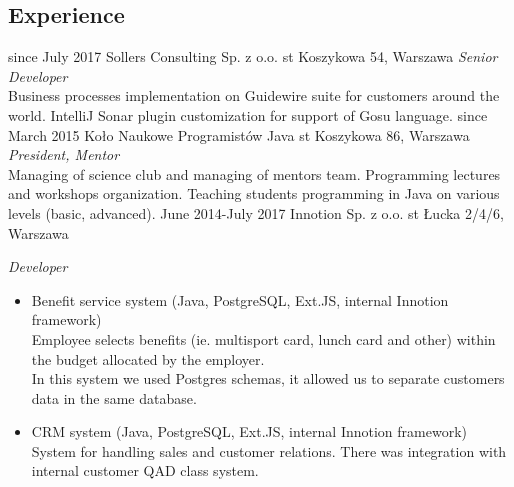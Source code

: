 \documentclass[]{friggeri-cv} %
\begin{document}
	\begin{absolutelynopagebreak}
		\section{Experience}
		\begin{entrylist}
			\entry
			{since July 2017}
			{Sollers Consulting Sp. z o.o.}
			{st Koszykowa 54, Warszawa}
			{\emph{Senior Developer}\\
				Business processes implementation on Guidewire suite for customers around the world. IntelliJ Sonar plugin customization for support of Gosu language.
			}
			\entry
			{since March 2015}
			{Koło Naukowe Programistów Java}
			{st Koszykowa 86, Warszawa}
			{\emph{President, Mentor}\\
				Managing of science club and managing of mentors team. Programming lectures and workshops organization. Teaching students programming in Java on various levels (basic, advanced).
			}
			\entry
			{June 2014-July 2017}
			{Innotion Sp. z o.o.}
			{st Łucka 2/4/6, Warszawa}
			{\emph{Developer}
			\begin{itemize}
				\item Benefit service system (Java, PostgreSQL, Ext.JS, internal Innotion framework)\\
					Employee selects benefits (ie. multisport card, lunch card and other) within the budget allocated by the employer.\\
					In this system we used Postgres schemas, it allowed us to separate customers data in the same database.
				\item CRM system (Java, PostgreSQL, Ext.JS, internal Innotion framework)
					System for handling sales and customer relations. There was integration with internal customer QAD class system.
			\end{itemize}
			}
		\end{entrylist}
	\end{absolutelynopagebreak}
	
\end{document}
